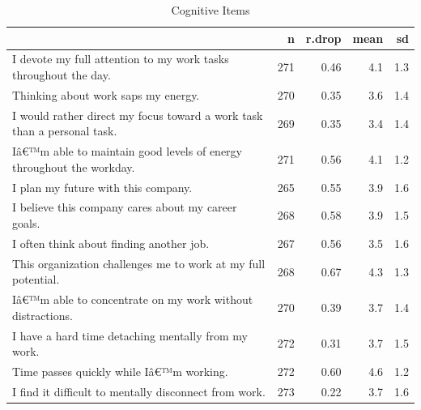 \documentclass[
]{book}
\begin{document}
\begin{table}

\caption{\label{tab:rdrop3}Cognitive Items}
\centering
\begin{tabular}[t]{l|r|r|r|r}
\hline
  & n & r.drop & mean & sd\\
\hline
I devote my full attention to my work tasks throughout the day. & 271 & 0.46 & 4.1 & 1.3\\
\hline
Thinking about work saps my energy. & 270 & 0.35 & 3.6 & 1.4\\
\hline
I would rather direct my focus toward a work task than a personal task. & 269 & 0.35 & 3.4 & 1.4\\
\hline
Iâ€™m able to maintain good levels of energy throughout the workday. & 271 & 0.56 & 4.1 & 1.2\\
\hline
I plan my future with this company. & 265 & 0.55 & 3.9 & 1.6\\
\hline
I believe this company cares about my career goals. & 268 & 0.58 & 3.9 & 1.5\\
\hline
I often think about finding another job. & 267 & 0.56 & 3.5 & 1.6\\
\hline
This organization challenges me to work at my full potential. & 268 & 0.67 & 4.3 & 1.3\\
\hline
Iâ€™m able to concentrate on my work without distractions. & 270 & 0.39 & 3.7 & 1.4\\
\hline
I have a hard time detaching mentally from my work. & 272 & 0.31 & 3.7 & 1.5\\
\hline
Time passes quickly while Iâ€™m working. & 272 & 0.60 & 4.6 & 1.2\\
\hline
I find it difficult to mentally disconnect from work. & 273 & 0.22 & 3.7 & 1.6\\
\hline
\end{tabular}
\end{table}
\end{document}
